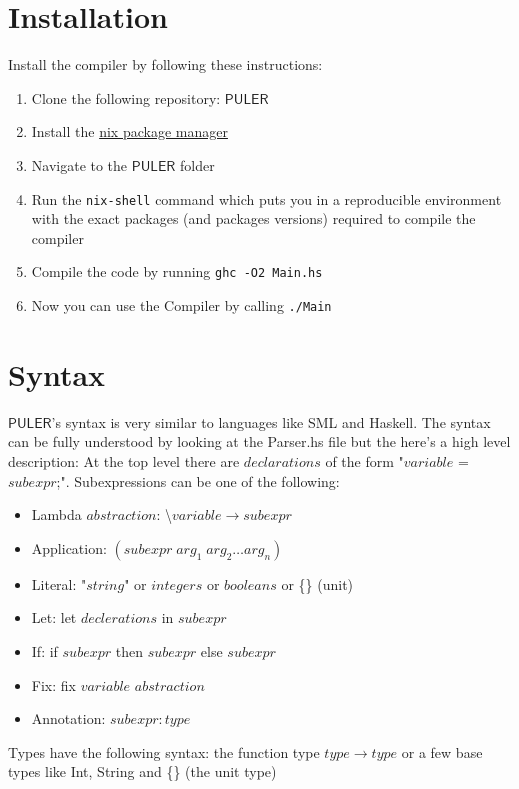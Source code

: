 \documentclass{article} %
\newcommand{\PULER}{\mathsf{PULER}}
\begin{document}
\section{Installation}
Install the compiler by following these instructions:
\begin{enumerate}
    \item Clone the following repository: \href{https://github.com/bmabsout/PULER.git}{$\PULER$}
    \item Install the \href{https://nixos.org/nix/}{nix package manager}
    \item Navigate to the $\PULER$ folder
    \item Run the \texttt{nix-shell} command which puts you in a reproducible environment with the exact packages (and packages versions) required to compile the compiler
    \item Compile the code by running \texttt{ghc -O2 Main.hs}
    \item Now you can use the Compiler by calling \texttt{./Main}
\end{enumerate}
\newpage
\section{Syntax}
$\PULER$'s syntax is very similar to languages like SML and Haskell. The syntax can be fully understood by looking at the Parser.hs file but the here's a high level description: At the top level there are $declarations$ of the form "$variable$ = $subexpr$;". Subexpressions can be one of the following:
\begin{itemize}
    \item Lambda $abstraction$: \textbackslash $variable \to subexpr$
    \item Application: $(subexpr\;arg_1\;arg_2 \dots arg_n)$
    \item Literal: "$string$" or $integers$ or $booleans$ or \{\} (unit)
    \item Let: let $declerations$ in $subexpr$
    \item If: if $subexpr$ then $subexpr$ else $subexpr$
    \item Fix: fix $variable$ $abstraction$
    \item Annotation: $subexpr: type$
\end{itemize}
    Types have the following syntax: the function type $type \to type$ or a few base types like Int, String and \{\} (the unit type)
\end{document}
